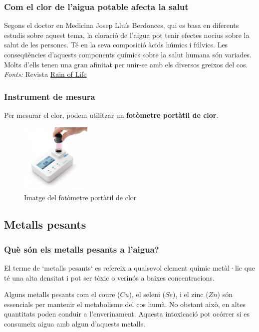 \subsubsection{Com el clor de l'aigua potable afecta la salut}
Segons el doctor en Medicina Josep Lluís Berdonces, qui es basa en diferents estudis sobre aquest tema, la cloració de l’aigua pot tenir efectes nocius sobre la salut de les persones. Té en la seva composició àcids húmics i fúlvics. Les conseqüències d’aquests components químics sobre la salut humana són variades. Molts d’ells tenen una gran afinitat per unir-se amb els diversos greixos del cos.\\
\textit{Fonts:} Revista \href{https://rainoflife.com/cloro-agua-potable/}{Rain of Life}
\subsubsection{Instrument de mesura}
Per mesurar el clor, podem utilitzar un \textbf{fotòmetre portàtil de clor}.
\begin{figure}[H]
\centering
\includegraphics[width=0.3\textwidth]{./Figures/Cloro.jpg}
\caption{Imatge del fotòmetre portàtil de clor}
\label{fig:clormetre}
\end{figure}

\subsection{Metalls pesants} \label{subsec:metallspesats}
\subsubsection{Què són els metalls pesants a l’aigua?}
El terme de `metalls pesants` es refereix a qualsevol element químic metàl·lic que té una alta densitat i pot ser tòxic o verinós a baixes concentracions.

Alguns metalls pesants com el coure ($Cu$), el seleni ($Se$), i el zinc ($Zn$) són essencials per mantenir el metabolisme del cos humà. No obstant això, en altes quantitats poden conduir a l'enverinament. Aquesta intoxicació pot ocórrer si es consumeix aigua amb algun d’aquests metalls.
